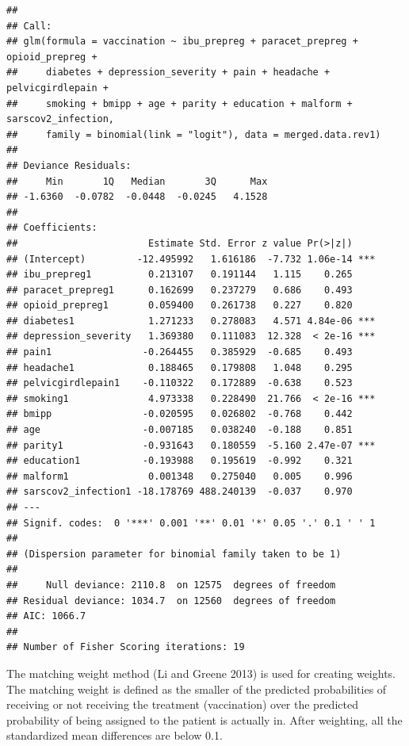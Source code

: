 \documentclass[
]{article}
\begin{document}
\begin{verbatim}
## 
## Call:
## glm(formula = vaccination ~ ibu_prepreg + paracet_prepreg + opioid_prepreg + 
##     diabetes + depression_severity + pain + headache + pelvicgirdlepain + 
##     smoking + bmipp + age + parity + education + malform + sarscov2_infection, 
##     family = binomial(link = "logit"), data = merged.data.rev1)
## 
## Deviance Residuals: 
##     Min       1Q   Median       3Q      Max  
## -1.6360  -0.0782  -0.0448  -0.0245   4.1528  
## 
## Coefficients:
##                       Estimate Std. Error z value Pr(>|z|)    
## (Intercept)         -12.495992   1.616186  -7.732 1.06e-14 ***
## ibu_prepreg1          0.213107   0.191144   1.115    0.265    
## paracet_prepreg1      0.162699   0.237279   0.686    0.493    
## opioid_prepreg1       0.059400   0.261738   0.227    0.820    
## diabetes1             1.271233   0.278083   4.571 4.84e-06 ***
## depression_severity   1.369380   0.111083  12.328  < 2e-16 ***
## pain1                -0.264455   0.385929  -0.685    0.493    
## headache1             0.188465   0.179808   1.048    0.295    
## pelvicgirdlepain1    -0.110322   0.172889  -0.638    0.523    
## smoking1              4.973338   0.228490  21.766  < 2e-16 ***
## bmipp                -0.020595   0.026802  -0.768    0.442    
## age                  -0.007185   0.038240  -0.188    0.851    
## parity1              -0.931643   0.180559  -5.160 2.47e-07 ***
## education1           -0.193988   0.195619  -0.992    0.321    
## malform1              0.001348   0.275040   0.005    0.996    
## sarscov2_infection1 -18.178769 488.240139  -0.037    0.970    
## ---
## Signif. codes:  0 '***' 0.001 '**' 0.01 '*' 0.05 '.' 0.1 ' ' 1
## 
## (Dispersion parameter for binomial family taken to be 1)
## 
##     Null deviance: 2110.8  on 12575  degrees of freedom
## Residual deviance: 1034.7  on 12560  degrees of freedom
## AIC: 1066.7
## 
## Number of Fisher Scoring iterations: 19
\end{verbatim}

The matching weight method (Li and Greene 2013) is used for creating
weights. The matching weight is defined as the smaller of the predicted
probabilities of receiving or not receiving the treatment (vaccination)
over the predicted probability of being assigned to the patient is
actually in. After weighting, all the standardized mean differences are
below 0.1.
\end{document}

